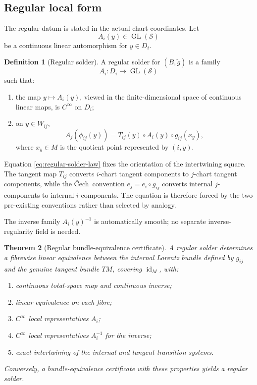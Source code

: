 \documentclass[11pt,a4paper]{article}
\newtheorem{theorem}{Theorem}[section]
\theoremstyle{definition}
\newtheorem{definition}[theorem]{Definition}
\theoremstyle{remark}
\newcommand{\Smodel}{\mathcal{S}}
\newcommand{\GL}{\operatorname{GL}}
\newcommand{\id}{\operatorname{id}}
\newcommand{\Cech}{\ifmmode\text{\v{C}ech}\else\v{C}ech\fi}
\begin{document}
\subsection{Regular local form}

The regular datum is stated in the actual chart coordinates.  Let
\[
   A_i(y)\in\GL(\Smodel)
\]
be a continuous linear automorphism for \(y\in D_i\).

\begin{definition}[Regular solder]
\label{def:regular-solder}
A regular solder for \((B,\widetilde g)\) is a family
\[
   A_i:D_i\longrightarrow\GL(\Smodel)
\tag{7.3}
\]
such that:
\begin{enumerate}
\item the map \(y\mapsto A_i(y)\), viewed in the finite-dimensional space
      of continuous linear maps, is \(C^\infty\) on \(D_i\);
\item on \(y\in W_{ij}\),
\[
  A_j(\phi_{ij}(y))
  =
  T_{ij}(y)\circ A_i(y)\circ
  g_{ij}(x_y),
\tag{7.4}\label{eq:regular-solder-law}
\]
where \(x_y\in M\) is the quotient point represented by \((i,y)\).
\end{enumerate}
\end{definition}

Equation \eqref{eq:regular-solder-law} fixes the orientation of the intertwining square.
The tangent map \(T_{ij}\) converts \(i\)-chart tangent components to
\(j\)-chart tangent components, while the \Cech\ convention
\(e_j=e_i\circ g_{ij}\) converts internal \(j\)-components to internal
\(i\)-components.  The equation is therefore forced by the two pre-existing
conventions rather than selected by analogy.

The inverse family \(A_i(y)^{-1}\) is automatically smooth; no separate
inverse-regularity field is needed.

\begin{theorem}[Regular bundle-equivalence certificate]
\label{thm:bundle-equivalence}
A regular solder determines a fibrewise linear equivalence between the
internal Lorentz bundle defined by \(g_{ij}\) and the genuine tangent bundle
\(TM\), covering \(\id_M\), with:
\begin{enumerate}
\item continuous total-space map and continuous inverse;
\item linear equivalence on each fibre;
\item \(C^\infty\) local representatives \(A_i\);
\item \(C^\infty\) local representatives \(A_i^{-1}\) for the inverse;
\item exact intertwining of the internal and tangent transition systems.
\end{enumerate}
Conversely, a bundle-equivalence certificate with these properties yields a
regular solder.
\end{theorem}
\end{document}
